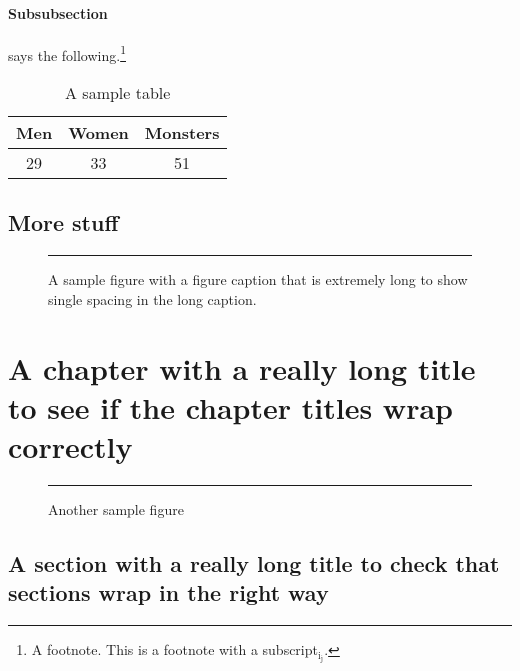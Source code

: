 \documentclass[lscape]{msu-thesis}
\begin{document}
\subsubsection{Subsubsection}
\begin{exe}
\ex\label{1}
\begin{xlist}
\end{xlist}
\end{exe}
\lipsum[1]
\lipsum[2]\cite{Munn1999} says the following.\footnote{A footnote. This is a footnote with a subscript$_{\text{i}_{\text{j}}}$.  \lipsum[9]} \lipsum[2]
\begin{table}
\centering
\begin{tabular}{ccc}
\toprule
Men & Women & Monsters\\
\midrule
29 & 33 & 51\\
\bottomrule
\end{tabular}
\caption{A sample table}
\end{table}

\lipsum[3]
\section{More stuff}
\lipsum[4]\cite{Munn2005}
\begin{figure}
\centering
{\color{gray!40}\rule{2in}{3in}}
\caption[A sample figure]{A sample figure with a figure caption that is extremely long to show single spacing in the long caption.}
\end{figure}
\lipsum[5]
\lipsum[10]
\chapter[A chapter with a really long title to\\see if the chapter titles wrap correctly]{A chapter with a really long title to see if the chapter titles wrap correctly}
\lipsum
\begin{figure}
\centering
{\color{gray!40}\rule{4in}{2in}}
\caption{Another sample figure}
\end{figure}
\lipsum[6]
\section{A section with a really long title to check that sections wrap in the right way}
\end{document}
